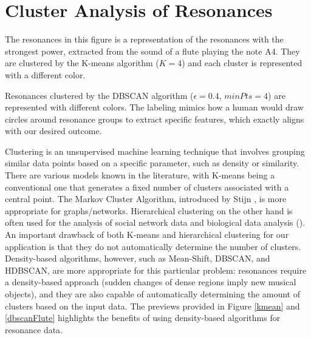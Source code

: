 \chapter{Cluster Analysis of Resonances}
\label{chap:cluster}

\begin{marginfigure}
\vspace{6cm}

\caption{The resonances in this figure is a representation of the resonances with the strongest power, extracted from the sound of a flute playing the note A4. They are clustered by the K-means algorithm ($K=4$) and each cluster is represented with a different color.}
\label{kmean} 
\end{marginfigure}

\begin{marginfigure}

\caption{Resonances clustered by the DBSCAN algorithm ($\epsilon=0.4$, $minPts = 4$) are represented with different colors. The labeling mimics how a human would draw circles around resonance groups to extract specific features, which exactly aligns with our desired outcome.}
\label{dbscanFlute} 
\end{marginfigure}

Clustering is an unsupervised machine learning technique that involves grouping similar data points based on a specific parameter, such as density or similarity. There are various models known in the literature, with K-means being a conventional one that generates a fixed number of clusters associated with a central point. The Markov Cluster Algorithm, introduced by Stijn \textcite{van_dongen_graph_2008}, is more appropriate for graphs/networks. Hierarchical clustering on the other hand is often used for the analysis of social network data and biological data analysis (\cite{hexmoor_diffusion_nodate, yeturu_chapter_2020}). An important drawback of both K-means and hierarchical clustering for our application is that they do not automatically determine the number of clusters. Density-based algorithms, however, such as Mean-Shift, DBSCAN, and HDBSCAN, are more appropriate for this particular problem: resonances require a density-based approach (sudden changes of dense regions imply new musical objects), and they are also capable of automatically determining the amount of clusters based on the input data.
The previews provided in Figure \ref{kmean} and \ref{dbscanFlute} highlights the benefits of using density-based algorithms for resonance data. 


